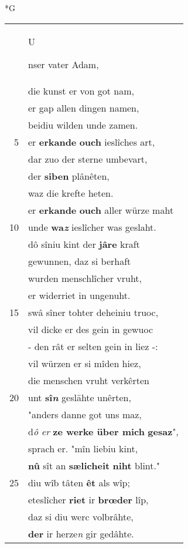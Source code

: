 \documentclass[8pt,a4paper,notitlepage]{article}
\begin{document}
\begin{table}[ht]
\begin{minipage}[t]{0.5\linewidth}
\small
\begin{center}*G
\end{center}
\begin{tabular}{rl}
 & \begin{large}U\end{large}nser vater Adam,\\ 
 & die kunst er von got nam,\\ 
 & er gap allen dingen namen,\\ 
 & beidiu wilden unde zamen.\\ 
5 & er \textbf{erkande} \textbf{ouch} ieslîches art,\\ 
 & dar zuo der sterne umbevart,\\ 
 & der \textbf{siben} plânêten,\\ 
 & waz die krefte heten.\\ 
 & er \textbf{erkande} \textbf{ouch} aller würze maht\\ 
10 & unde \textbf{wa\textit{z}} ieslîcher was geslaht.\\ 
 & dô sîniu kint der \textbf{jâre} kraft\\ 
 & gewunnen, daz si berhaft\\ 
 & wurden menschlîcher vruht,\\ 
 & er widerriet in ungenuht.\\ 
15 & swâ sîner tohter deheiniu truoc,\\ 
 & vil dicke er des gein in gewuoc\\ 
 & - den rât er selten gein in liez -:\\ 
 & vil würzen er si mîden hiez,\\ 
 & die menschen vruht verkêrten\\ 
20 & unt \textbf{sî\textit{n}} geslähte unêrten,\\ 
 & "anders danne got uns maz,\\ 
 & d\textit{ô er} \textbf{ze werke über mich} \textbf{gesaz}",\\ 
 & sprach er. "mîn liebiu kint,\\ 
 & \textbf{nû} sît an \textbf{sælicheit} \textbf{niht} blint."\\ 
25 & diu wîb tâten \textbf{êt} als wîp;\\ 
 & eteslîcher \textbf{riet} ir \textbf{brœder} lîp,\\ 
 & daz si diu werc volbrâhte,\\ 
 & \textbf{der} ir herze\textit{n} gir gedâhte.\\ 

\end{tabular}
\end{minipage}
\end{table}
\end{document}
